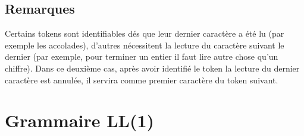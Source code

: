 \documentclass[a4paper,10pt]{article}
\begin{document}
	\subsection{Remarques}
		Certains tokens sont identifiables dés que leur dernier caractère a été lu (par exemple les accolades), 
		d'autres nécessitent la lecture du caractère suivant le dernier (par exemple, pour terminer un entier il faut lire autre chose qu'un chiffre).
		Dans ce deuxième cas, après avoir identifié le token la lecture du dernier caractère est annulée, il servira comme premier caractère du token suivant.

\section{Grammaire LL(1)}

\newcommand{\varname}[1]{\begin{math}\langle\end{math}#1\begin{math}\rangle\end{math}}
\newcommand{\num}[1]{\begin{math}[#1]\end{math}}
\end{document}
